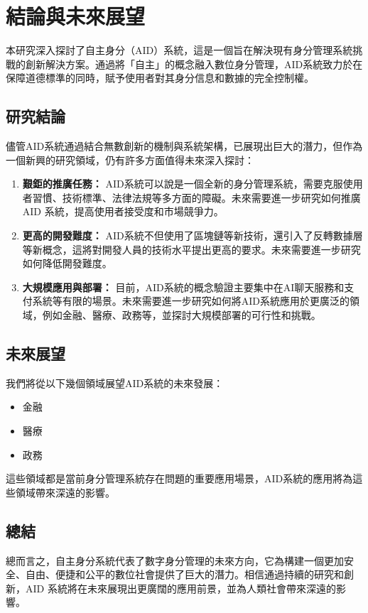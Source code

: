 
\chapter{結論與未來展望}
本研究深入探討了自主身分（AID）系統，這是一個旨在解決現有身分管理系統挑戰的創新解決方案。通過將「自主」的概念融入數位身分管理，AID系統致力於在保障道德標準的同時，賦予使用者對其身分信息和數據的完全控制權。
\section{研究結論}
儘管AID系統通過結合無數創新的機制與系統架構，已展現出巨大的潛力，但作為一個新興的研究領域，仍有許多方面值得未來深入探討：
\begin{enumerate}
    \item \textbf{艱鉅的推廣任務：} AID系統可以說是一個全新的身分管理系統，需要克服使用者習慣、技術標準、法律法規等多方面的障礙。未來需要進一步研究如何推廣 AID 系統，提高使用者接受度和市場競爭力。
    \item \textbf{更高的開發難度：} AID系統不但使用了區塊鏈等新技術，還引入了反轉數據層等新概念，這將對開發人員的技術水平提出更高的要求。未來需要進一步研究如何降低開發難度。
    \item \textbf{大規模應用與部署：} 目前，AID系統的概念驗證主要集中在AI聊天服務和支付系統等有限的場景。未來需要進一步研究如何將AID系統應用於更廣泛的領域，例如金融、醫療、政務等，並探討大規模部署的可行性和挑戰。
\end{enumerate}
\section{未來展望}
我們將從以下幾個領域展望AID系統的未來發展：
\begin{itemize}
    \item 金融
    \item 醫療
    \item 政務
\end{itemize}
這些領域都是當前身分管理系統存在問題的重要應用場景，AID系統的應用將為這些領域帶來深遠的影響。
\section{總結}
總而言之，自主身分系統代表了數字身分管理的未來方向，它為構建一個更加安全、自由、便捷和公平的數位社會提供了巨大的潛力。相信通過持續的研究和創新，AID 系統將在未來展現出更廣闊的應用前景，並為人類社會帶來深遠的影響。
